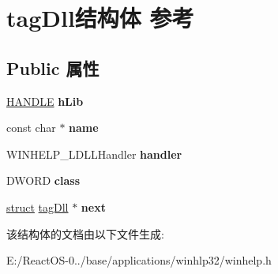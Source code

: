 \hypertarget{structtag_dll}{}\section{tag\+Dll结构体 参考}
\label{structtag_dll}
\subsection*{Public 属性}
\begin{DoxyCompactItemize}
\item 
\mbox{\label{structtag_dll_a427470823b779d996c2a55c68d72fc99}} 
\hyperlink{interfacevoid}{H\+A\+N\+D\+LE} {\bfseries h\+Lib}
\item 
\mbox{\label{structtag_dll_a513376101a74b0cf1316ad02cacafb65}} 
const char $\ast$ {\bfseries name}
\item 
\mbox{\label{structtag_dll_a8937deb9418587da22672b71697041ca}} 
W\+I\+N\+H\+E\+L\+P\+\_\+\+L\+D\+L\+L\+Handler {\bfseries handler}
\item 
\mbox{\label{structtag_dll_aecd18d72da5911789204b30aa1df8dd1}} 
D\+W\+O\+RD {\bfseries class}
\item 
\mbox{\label{structtag_dll_a80df917001997e17a0e1ad1cff188492}} 
\hyperlink{interfacestruct}{struct} \hyperlink{structtag_dll}{tag\+Dll} $\ast$ {\bfseries next}
\end{DoxyCompactItemize}


该结构体的文档由以下文件生成\+:\begin{DoxyCompactItemize}
\item 
E\+:/\+React\+O\+S-\/0../base/applications/winhlp32/winhelp.\+h\end{DoxyCompactItemize}
